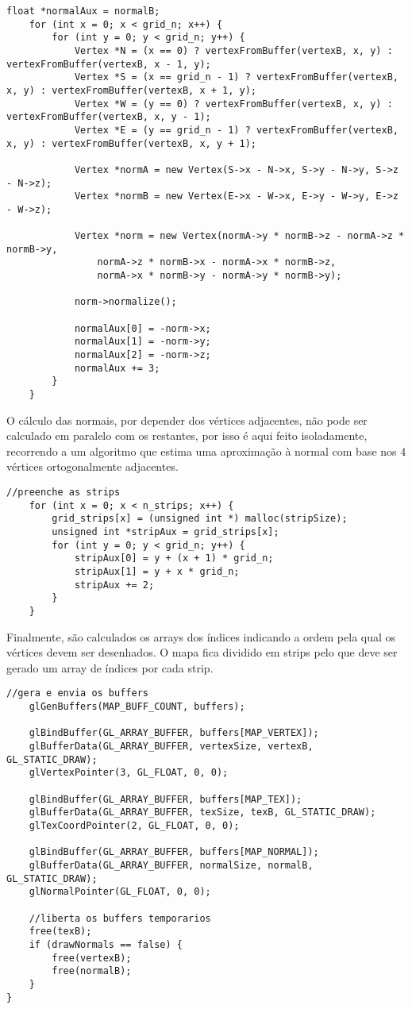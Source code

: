 \begin{lstlisting}[caption=Cálculo dos buffers para VBOs (normais)]
	float *normalAux = normalB;
	for (int x = 0; x < grid_n; x++) {
		for (int y = 0; y < grid_n; y++) {
			Vertex *N = (x == 0) ? vertexFromBuffer(vertexB, x, y) : vertexFromBuffer(vertexB, x - 1, y);
			Vertex *S = (x == grid_n - 1) ? vertexFromBuffer(vertexB, x, y) : vertexFromBuffer(vertexB, x + 1, y);
			Vertex *W = (y == 0) ? vertexFromBuffer(vertexB, x, y) : vertexFromBuffer(vertexB, x, y - 1);
			Vertex *E = (y == grid_n - 1) ? vertexFromBuffer(vertexB, x, y) : vertexFromBuffer(vertexB, x, y + 1);

			Vertex *normA = new Vertex(S->x - N->x, S->y - N->y, S->z - N->z);
			Vertex *normB = new Vertex(E->x - W->x, E->y - W->y, E->z - W->z);

			Vertex *norm = new Vertex(normA->y * normB->z - normA->z * normB->y,
				normA->z * normB->x - normA->x * normB->z,
				normA->x * normB->y - normA->y * normB->y);

			norm->normalize();

			normalAux[0] = -norm->x;
			normalAux[1] = -norm->y;
			normalAux[2] = -norm->z;
			normalAux += 3;
		}
	}
\end{lstlisting}
O cálculo das normais, por depender dos vértices adjacentes, não pode ser calculado em paralelo com os restantes, por isso é aqui feito isoladamente, recorrendo a um algoritmo que estima uma aproximação à normal com base nos 4 vértices ortogonalmente adjacentes.

\begin{lstlisting}[caption=Cálculo dos buffers para VBOs (índices)]
	//preenche as strips
	for (int x = 0; x < n_strips; x++) {
		grid_strips[x] = (unsigned int *) malloc(stripSize);
		unsigned int *stripAux = grid_strips[x];
		for (int y = 0; y < grid_n; y++) {
			stripAux[0] = y + (x + 1) * grid_n;
			stripAux[1] = y + x * grid_n;
			stripAux += 2;
		}
	}
\end{lstlisting}

Finalmente, são calculados os arrays dos índices indicando a ordem pela qual os vértices devem ser desenhados. O mapa fica dividido em strips pelo que deve ser gerado um array de índices por cada strip.

\begin{lstlisting}[caption=Cálculo dos buffers para VBOs (envio dos buffers)]
	//gera e envia os buffers
	glGenBuffers(MAP_BUFF_COUNT, buffers);

	glBindBuffer(GL_ARRAY_BUFFER, buffers[MAP_VERTEX]);
	glBufferData(GL_ARRAY_BUFFER, vertexSize, vertexB, GL_STATIC_DRAW);
	glVertexPointer(3, GL_FLOAT, 0, 0);

	glBindBuffer(GL_ARRAY_BUFFER, buffers[MAP_TEX]);
	glBufferData(GL_ARRAY_BUFFER, texSize, texB, GL_STATIC_DRAW);
	glTexCoordPointer(2, GL_FLOAT, 0, 0);

	glBindBuffer(GL_ARRAY_BUFFER, buffers[MAP_NORMAL]);
	glBufferData(GL_ARRAY_BUFFER, normalSize, normalB, GL_STATIC_DRAW);
	glNormalPointer(GL_FLOAT, 0, 0);

	//liberta os buffers temporarios
	free(texB);
	if (drawNormals == false) {
		free(vertexB);
		free(normalB);
	}
}
\end{lstlisting}

